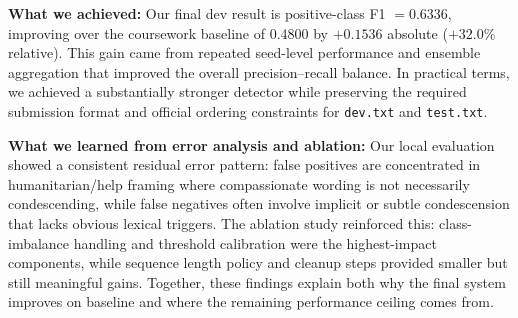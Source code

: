 \documentclass[11pt, a4paper]{article}
\begin{document}
\textbf{What we achieved:}
Our final dev result is positive-class F1 \(=0.6336\), improving over the coursework baseline of \(0.4800\) by \(+0.1536\) absolute (\(+32.0\%\) relative). This gain came from repeated seed-level performance and ensemble aggregation that improved the overall precision--recall balance. In practical terms, we achieved a substantially stronger detector while preserving the required submission format and official ordering constraints for \texttt{dev.txt} and \texttt{test.txt}.

\textbf{What we learned from error analysis and ablation:}
Our local evaluation showed a consistent residual error pattern: false positives are concentrated in humanitarian/help framing where compassionate wording is not necessarily condescending, while false negatives often involve implicit or subtle condescension that lacks obvious lexical triggers. The ablation study reinforced this: class-imbalance handling and threshold calibration were the highest-impact components, while sequence length policy and cleanup steps provided smaller but still meaningful gains. Together, these findings explain both why the final system improves on baseline and where the remaining performance ceiling comes from.
\end{document}

